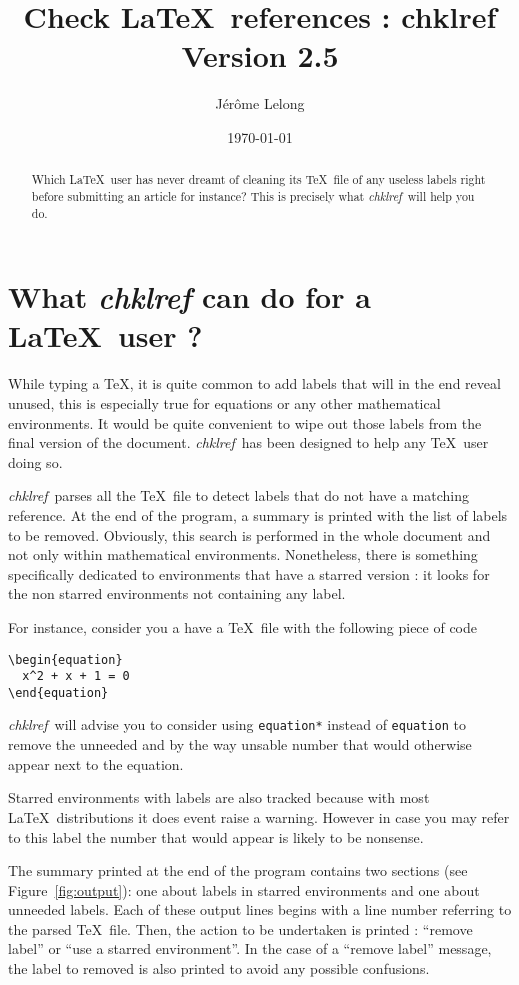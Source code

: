 \documentclass[a4paper,11pt,twoside]{article}
\title{Check \LaTeX\ references : chklref \\
Version 2.5}
\date{\today}
\author{J\'er\^ome Lelong}
\def\chk{{\it chklref}}
\def\page{}%
\def\page{\HCode{<div id='page'>}}%
\begin{document}
\page
\maketitle

\begin{abstract} Which \LaTeX\ user has never dreamt of cleaning its \TeX\ file
  of any useless labels right before submitting an article for instance? This is
  precisely what \chk\ will help you do.
\end{abstract}

\section{What {\it chklref} can do for a \LaTeX\ user ?}

While typing a \TeX, it is quite common to add labels that will in the end
reveal unused, this is especially true for equations or any other mathematical
environments. It would be quite convenient to wipe out those labels from the
final version of the document. \chk\ has been designed to help any \TeX\
user doing so.

\chk\ parses all the \TeX\ file to detect labels that do not have a matching
reference. At the end of the program, a summary is printed with the list of
labels to be removed. Obviously, this search is performed in the whole document
and not only within mathematical environments. Nonetheless, there is something
specifically dedicated to environments that have a starred version : it looks
for the non starred environments not containing any label.

For instance, consider you a have a \TeX\ file with the following piece of code
\begin{verbatim}
\begin{equation}
  x^2 + x + 1 = 0
\end{equation}
\end{verbatim}
\chk\ will advise you to consider using \verb!equation*! instead of
\verb!equation! to remove the unneeded and by the way unsable number that would
otherwise appear next to the equation.

Starred environments with labels are also tracked because with most \LaTeX\
distributions it does event raise a warning. However in case you may refer to
this label the number that would appear is likely to be nonsense.

The summary printed at the end of the program contains two sections (see
Figure~\ref{fig:output}): one about labels in starred environments and one about
unneeded labels. Each of these output lines begins with a line number referring
to the parsed \TeX\ file. Then, the action to be undertaken is printed :
``remove label'' or ``use a starred environment''. In the case of a ``remove
label'' message, the label to removed is also printed to avoid any possible
confusions.
\end{document}
